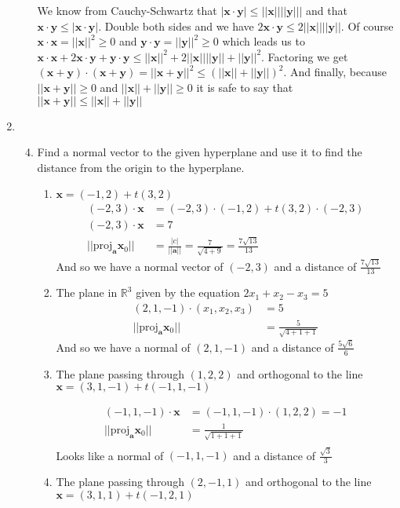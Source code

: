 \documentclass[letterpaper]{article}
\begin{document}
\begin{enumerate}
\begin{enumerate}
    We know from Cauchy-Schwartz that $|\mathbf{x}\cdot\mathbf{y}|\le||\mathbf{x}||||\mathbf{y}|||$ and that $\mathbf{x}\cdot\mathbf{y}\le |\mathbf{x}\cdot\mathbf{y}|$.
    Double both sides and we have $2\mathbf{x}\cdot\mathbf{y}\le 2||\mathbf{x}||||\mathbf{y}||$.
    Of course $\mathbf{x}\cdot\mathbf{x}=||\mathbf{x}||^2\ge 0$ and $\mathbf{y}\cdot\mathbf{y}=||\mathbf{y}||^2\ge 0$ which leads us to $\mathbf{x}\cdot\mathbf{x}+2\mathbf{x}\cdot\mathbf{y}+\mathbf{y}\cdot\mathbf{y}\le ||\mathbf{x}||^2+2||\mathbf{x}||||\mathbf{y}||+||\mathbf{y}||^2$.
    Factoring we get $(\mathbf{x}+\mathbf{y})\cdot(\mathbf{x}+\mathbf{y})=||\mathbf{x}+\mathbf{y}||^2\le (||\mathbf{x}||+||\mathbf{y}||)^2$.
    And finally, because $||\mathbf{x}+\mathbf{y}||\ge 0$ and $||\mathbf{x}||+||\mathbf{y}||\ge 0$ it is safe to say that $||\mathbf{x}+\mathbf{y}||\le ||\mathbf{x}||+||\mathbf{y}||$
  \end{enumerate}
\item
  \begin{enumerate}
  \setcounter{enumii}{3}
  \item
    Find a normal vector to the given hyperplane and use it to find the distance from the origin to the hyperplane.
    \begin{enumerate}
    \item
      $\mathbf{x}=(-1,2)+t(3,2)$
      \begin{align*}
        (-2,3)\cdot\mathbf{x}&=(-2,3)\cdot(-1,2)+t(3,2)\cdot(-2,3)\\
        (-2,3)\cdot\mathbf{x}&=7\\
        ||\text{proj}_{\mathbf{a}}\mathbf{x}_0||&=\frac{|c|}{||\mathbf{a}||}=\frac{7}{\sqrt{4+9}}=\frac{7\sqrt{13}}{13}
      \end{align*}
      And so we have a normal vector of $(-2,3)$ and a distance of $\frac{7\sqrt{13}}{13}$
    \item
      The plane in $\mathbb{R}^3$ given by the equation $2x_1+x_2-x_3=5$
      \begin{align*}
        (2,1,-1)\cdot(x_1,x_2,x_3)&=5\\
        ||\text{proj}_{\mathbf{a}}\mathbf{x}_0||&=\frac{5}{\sqrt{4+1+1}}
      \end{align*}
      And so we have a normal of $(2,1,-1)$ and a distance of $\frac{5\sqrt{6}}{6}$
    \item
      The plane passing through $(1,2,2)$ and orthogonal to the line $\mathbf{x}=(3,1,-1)+t(-1,1,-1)$

      \begin{align*}
        (-1,1,-1)\cdot\mathbf{x}&=(-1,1,-1)\cdot(1,2,2)=-1\\
        ||\text{proj}_{\mathbf{a}}\mathbf{x}_0||&=\frac{1}{\sqrt{1+1+1}}\\
      \end{align*}
      Looks like a normal of $(-1,1,-1)$ and a distance of $\frac{\sqrt{3}}{3}$
    \item
      The plane passing through $(2,-1,1)$ and orthogonal to the  line $\mathbf{x}=(3,1,1)+t(-1,2,1)$


\end{enumerate}
\end{enumerate}
\end{enumerate}
\end{document}
